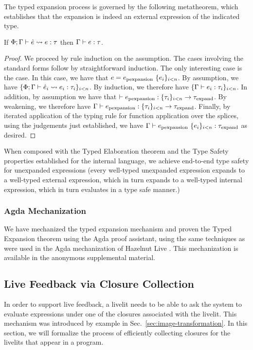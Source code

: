 The typed expansion process is governed by the following metatheorem, which establishes that the expansion
is indeed an external expression of the indicated type.



\begin{theorem}
    If $\Phi; \Gamma \vdash \hat e \leadsto e : \tau$ then $\Gamma \vdash e : \tau$.
\end{theorem}
\begin{proof}
    We proceed by rule induction on the assumption.
    The cases involving the standard forms follow by straightforward induction.
    The only interesting case is the  case.
    In this case, we have that $e = e_\text{pexpansion}~\{e_i\}_{i < n}$.
    By assumption, we have $\{ \Phi; \Gamma \vdash \hat e_i \leadsto e_i : \tau_i \}_{i < n}$.
    By induction, we therefore have $\{ \Gamma \vdash e_i : \tau_i \}_{i < n}$.
    In addition, by assumption we have that $\vdash e_\text{pexpansion} : \{\tau_i\}_{i < n} \rightarrow \tau_\text{expand}$.
    By weakening, we therefore have $\Gamma \vdash e_\text{pexpansion} : \{\tau_i\}_{i < n} \rightarrow \tau_\text{expand}$.
    Finally, by iterated application of the typing rule for function application over the splices,
    using the judgements just established,
    we have $\Gamma \vdash e_\text{pexpansion}~\{e_i\}_{i < n} : \tau_\text{expand}$ as desired.
\end{proof}

When composed with the Typed Elaboration theorem and the Type Safety properties established for the internal
language, we achieve end-to-end type safety for unexpanded expressions (every well-typed unexpanded
expression expands to a well-typed external expression, which in turn expands to a well-typed internal
expression, which in turn evaluates in a type safe manner.)

\subsubsection{Agda Mechanization}
We have mechanized the typed expansion mechanism and proven the Typed Expansion theorem
using the Agda proof assistant, using the same techniques as were used in the Agda mechanization 
of Hazelnut Live \cite{HazelnutLive}. This mechanization is available in the anonymous 
supplemental material. 

\subsection{Live Feedback via Closure Collection}\label{sec:calculus-closure-collection}
In order to support live feedback, a livelit needs to be able to ask the system
to evaluate expressions under one of the closures associated with the livelit.
This mechanism was introduced by example in Sec.~\ref{sec:image-transformation}.
In this section, we will formalize the process of efficiently collecting closures
for the livelits that appear in a program.

